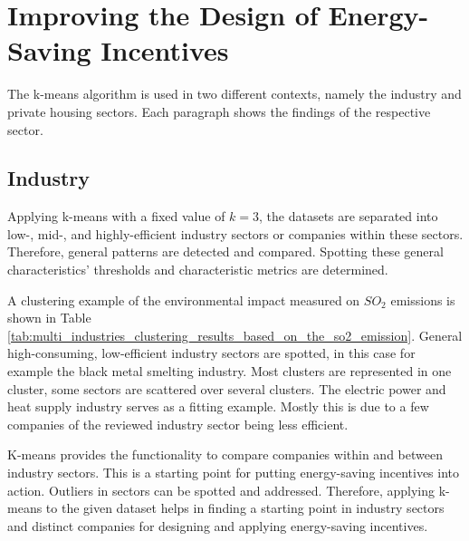 \section{Improving the Design of Energy-Saving Incentives}
\label{sec:improving_the_design_of_energy_saving_incentives}
The k-means algorithm is used in two different contexts, namely the industry and private housing sectors.
Each paragraph shows the findings of the respective sector.
\subsection{Industry}
Applying k-means with a fixed value of $k=3$, the datasets are separated into low-, mid-, and highly-efficient industry sectors or companies within these sectors.
Therefore, general patterns are detected and compared.
Spotting these general characteristics' thresholds and characteristic metrics are determined.

A clustering example of the environmental impact measured on $SO_2$ emissions is shown in Table \ref{tab:multi_industries_clustering_results_based_on_the_so2_emission}.
General high-consuming, low-efficient industry sectors are spotted, in this case for example the black metal smelting industry.
Most clusters are represented in one cluster, some sectors are scattered over several clusters.
The electric power and heat supply industry serves as a fitting example.
Mostly this is due to a few companies of the reviewed industry sector being less efficient.

K-means provides the functionality to compare companies within and between industry sectors.
This is a starting point for putting energy-saving incentives into action.
Outliers in sectors can be spotted and addressed.
Therefore, applying k-means to the given dataset helps in finding a starting point in industry sectors and distinct companies for designing and applying energy-saving incentives.

